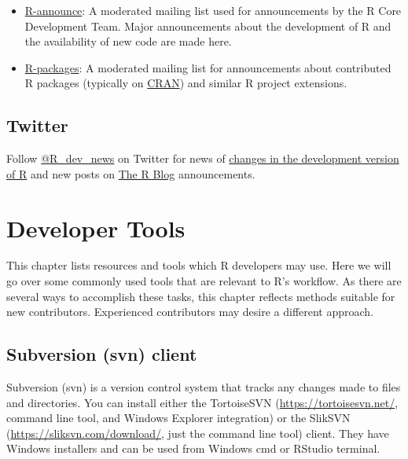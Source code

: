\documentclass[
]{book}
\providecommand{\tightlist}{%
  \setlength{\itemsep}{0pt}\setlength{\parskip}{0pt}}
\begin{document}
\begin{itemize}
\tightlist
\item
  \href{https://stat.ethz.ch/mailman/listinfo/r-announce}{R-announce}: A moderated mailing list used for announcements by the R Core Development Team. Major announcements about the development of R and the availability of new code are made here.
\item
  \href{https://stat.ethz.ch/mailman/listinfo/r-packages}{R-packages}: A moderated mailing list for announcements about contributed R packages (typically on \href{https://cran.r-project.org/}{CRAN}) and similar R project extensions.
\end{itemize}

\hypertarget{twitter}{%
\section{Twitter}\label{twitter}}

Follow \href{https://twitter.com/R_dev_news}{@R\_dev\_news} on Twitter for news of \href{https://developer.r-project.org/RSSfeeds.html}{changes in the development version of R} and new posts on \href{https://blog.r-project.org/}{The R Blog} announcements.

\hypertarget{DevTools}{%
\chapter{Developer Tools}\label{DevTools}}

This chapter lists resources and tools which R developers may use. Here we will go over some commonly used tools that are relevant to R's workflow. As there are several ways to accomplish these tasks, this chapter reflects methods suitable for new contributors. Experienced contributors may desire a different approach.

\hypertarget{subversion-svn-client}{%
\section{Subversion (svn) client}\label{subversion-svn-client}}

Subversion (svn) is a version control system that tracks any changes made to files and directories. You can install either the TortoiseSVN (\url{https://tortoisesvn.net/}, command line tool, and Windows Explorer integration) or the SlikSVN (\url{https://sliksvn.com/download/}, just the command line tool) client. They have Windows installers and can be used from Windows cmd or RStudio terminal.
\end{document}
